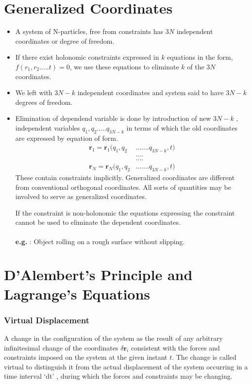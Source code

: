 \section{Generalized Coordinates}
\begin{itemize}
	\item A system of N-particles, free from constraints has $3N$ independent coordinates or degree of freedom. 
	\item If there exist holonomic constraints expressed in $k$ equations in the form,  $f(r_1,r_2.....t)=0$, we use these equations to eliminate $k$ of the $3N$ coordinates.
	\item We left with $3N-k$ independent coordinates and system said to have $3N-k$ degrees of freedom.
	\item Elimination of dependend variable is done by introduction of new $3N-k$ , independent variables $q_1,q_2.....q_{3N-k}$ in terms of which the old coordinates are expressed by equation of form.
\begin{align*}
	\textbf{r}_1=\textbf{r}_1(q_1,q_2&.......q_{3N-k}, t)\\
	&....\\
	&....\\
	\textbf{r}_N=\textbf{r}_N(q_1,q_2&.......q_{3N-k}, t)
\end{align*}
	These contain constraints implicitly. Generalized coordinates are different from conventional orthogonal coordinates. All sorts of quantities  may be involved to serve as generalized coordinates.
	\begin{note}
		If the constraint is non-holonomic the equations expressing the constraint cannot be used to eliminate the dependent coordinates.\\\\
		\textbf{e.g. } : Object rolling on a rough surface without slipping.
	\end{note}
	
\end{itemize}
\section{D'Alembert's Principle and Lagrange's Equations}
\subsubsection{Virtual Displacement}
A change in the configuration of the system as the result of any arbitrary infinitesimal change of the coordinates $\delta \textbf{r}_i$ consistent with the forces and constraints imposed on the system at the given instant $t$. The change is called virtual to distinguish it from the actual displacement of the system occurring in a time interval `dt' , during which the forces and constraints may be changing.
